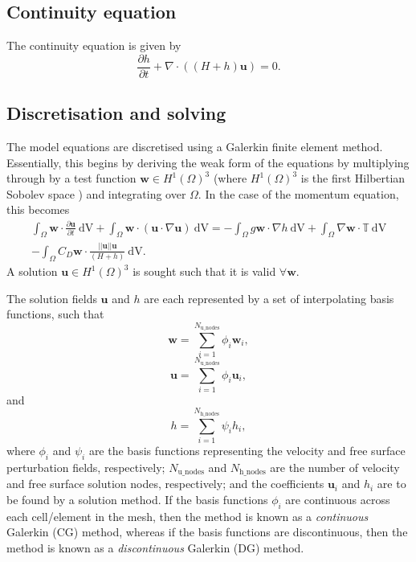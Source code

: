 \documentclass[a4paper,11pt]{report}
\begin{document}
\subsection{Continuity equation}
The continuity equation is given by
\begin{equation}
   \frac{\partial h}{\partial t} + \nabla\cdot\left(\left(H + h\right)\mathbf{u}\right) = 0.
\end{equation}

\subsection{Discretisation and solving}
The model equations are discretised using a Galerkin finite element method. Essentially, this begins by deriving the weak form of the equations by multiplying through by a test function $\mathbf{w} \in H^1(\Omega)^3$ (where $H^1(\Omega)^3$ is the first Hilbertian Sobolev space \citep{Elman_etal_2005}) and integrating over $\Omega$. In the case of the momentum equation, this becomes
\begin{eqnarray}
   \nonumber\int_{\Omega}\mathbf{w}\cdot\frac{\partial \mathbf{u}}{\partial t}\ \mathrm{dV} + \int_{\Omega}\mathbf{w}\cdot(\mathbf{u}\cdot\nabla\mathbf{u}) \ \mathrm{dV} = -\int_{\Omega}g\mathbf{w}\cdot\nabla h \ \mathrm{dV} + \int_{\Omega}\nabla\mathbf{w}\cdot \mathbb{T} \ \mathrm{dV} \\- \int_{\Omega}C_D\mathbf{w}\cdot\frac{||\mathbf{u}||\mathbf{u}}{(H + h)} \ \mathrm{dV}.
\end{eqnarray}
A solution $\mathbf{u} \in H^1(\Omega)^3$ is sought such that it is valid $\forall \mathbf{w}$.

The solution fields $\mathbf{u}$ and $h$ are each represented by a set of interpolating basis functions, such that
\begin{equation}
   \mathbf{w} = \sum_{i=1}^{N_\mathrm{u\_nodes}} \phi_i\mathbf{w}_i,
\end{equation}
\begin{equation}
   \mathbf{u} = \sum_{i=1}^{N_\mathrm{u\_nodes}} \phi_i\mathbf{u}_i,
\end{equation}
and
\begin{equation}
   h = \sum_{i=1}^{N_\mathrm{h\_nodes}} \psi_ih_i,
\end{equation}
where $\phi_i$ and $\psi_i$ are the basis functions representing the velocity and free surface perturbation fields, respectively; $N_\mathrm{u\_nodes}$ and $N_\mathrm{h\_nodes}$ are the number of velocity and free surface solution nodes, respectively; and the coefficients $\mathbf{u}_i$ and $h_i$ are to be found by a solution method. If the basis functions $\phi_i$ are continuous across each cell/element in the mesh, then the method is known as a \textit{continuous} Galerkin (CG) method, whereas if the basis functions are discontinuous, then the method is known as a \textit{discontinuous} Galerkin (DG) method.
\end{document}
